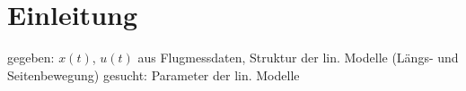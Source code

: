 \chapter{Einleitung}

gegeben: 	$ x(t) $, $ u(t) $ aus Flugmessdaten, Struktur der lin. Modelle (Längs- und Seitenbewegung)
gesucht: 	Parameter der lin. Modelle
